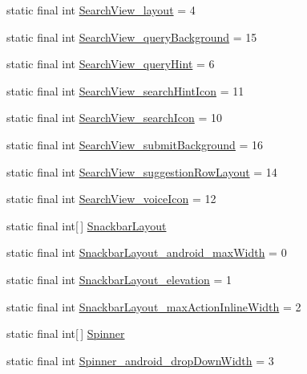 \begin{CompactItemize}
\item 
static final int \hyperlink{classandroid_1_1support_1_1v4_1_1_r_1_1styleable_70f15e7a0ccd231aa82768bfe48b1fec}{SearchView\_\-layout} = 4
\item 
static final int \hyperlink{classandroid_1_1support_1_1v4_1_1_r_1_1styleable_9edc86d9cbb248a65311249ed4ca415c}{SearchView\_\-queryBackground} = 15
\item 
static final int \hyperlink{classandroid_1_1support_1_1v4_1_1_r_1_1styleable_f0192b0ba88140e41e2b0f9db1bb970a}{SearchView\_\-queryHint} = 6
\item 
static final int \hyperlink{classandroid_1_1support_1_1v4_1_1_r_1_1styleable_4067485964152ef1a1eb4f8bf0d25188}{SearchView\_\-searchHintIcon} = 11
\item 
static final int \hyperlink{classandroid_1_1support_1_1v4_1_1_r_1_1styleable_2e407a80c6bca332a7b5c0632369c9dd}{SearchView\_\-searchIcon} = 10
\item 
static final int \hyperlink{classandroid_1_1support_1_1v4_1_1_r_1_1styleable_699aa92aa27e99d69cc974bc01481aea}{SearchView\_\-submitBackground} = 16
\item 
static final int \hyperlink{classandroid_1_1support_1_1v4_1_1_r_1_1styleable_603a0727c95352880049f37bb9b130ed}{SearchView\_\-suggestionRowLayout} = 14
\item 
static final int \hyperlink{classandroid_1_1support_1_1v4_1_1_r_1_1styleable_9e4c859282f5e9607d3b5ed4f4748148}{SearchView\_\-voiceIcon} = 12
\item 
static final int\mbox{[}$\,$\mbox{]} \hyperlink{classandroid_1_1support_1_1v4_1_1_r_1_1styleable_f3b816b2bb4147ee0c0cb792ff6d7454}{SnackbarLayout}
\item 
static final int \hyperlink{classandroid_1_1support_1_1v4_1_1_r_1_1styleable_9291e55de0c3f166cbb4305f9cfa38e9}{SnackbarLayout\_\-android\_\-maxWidth} = 0
\item 
static final int \hyperlink{classandroid_1_1support_1_1v4_1_1_r_1_1styleable_b3f175a59ff6b35450d8d3ec1d9a90ac}{SnackbarLayout\_\-elevation} = 1
\item 
static final int \hyperlink{classandroid_1_1support_1_1v4_1_1_r_1_1styleable_4e91b05c2e5aec649db0d92316818e0c}{SnackbarLayout\_\-maxActionInlineWidth} = 2
\item 
static final int\mbox{[}$\,$\mbox{]} \hyperlink{classandroid_1_1support_1_1v4_1_1_r_1_1styleable_7b6b9d4f9b35dbabe5f917505d63c414}{Spinner}
\item 
static final int \hyperlink{classandroid_1_1support_1_1v4_1_1_r_1_1styleable_cbe49385f464cc4ae61e3598c9e2cfdc}{Spinner\_\-android\_\-dropDownWidth} = 3

\end{CompactItemize}
